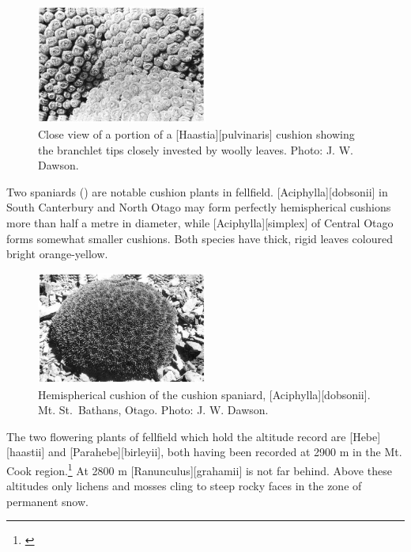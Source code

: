 \begin{figure}
	\includegraphics[width=0.5\textwidth]{graphics/figure109haastia.jpg}
	\centering
	\caption[Close view of a portion of a \emph{Haastia pulvinaris}]{Close view of a portion of a [Haastia][pulvinaris] cushion showing the branchlet tips closely invested by woolly leaves.
	Photo: J. W. Dawson.}%
	\label{fig:109haastia}
\end{figure}

Two spaniards () are notable cushion plants in fellfield. [Aciphylla][dobsonii] in South Canterbury and North Otago may form perfectly hemispherical cushions more than half a metre in diameter, while [Aciphylla][simplex] of Central Otago forms somewhat smaller cushions.
Both species have thick, rigid leaves coloured bright orange-yellow.

\begin{figure}
	\includegraphics[width=0.5\textwidth]{graphics/figure110cushion-spaniard.jpg}
	\centering
	\caption[Hemispherical cushion of the cushion spaniard]{Hemispherical cushion of the cushion spaniard, [Aciphylla][dobsonii].
	Mt. St.\ Bathans, Otago.
	Photo: J. W. Dawson.}%
	\label{fig:110cushion-spaniard}
\end{figure}

The two flowering plants of fellfield which hold the altitude record are [Hebe][haastii] and [Parahebe][birleyii], both having been recorded at 2900 m in the Mt.
Cook region.\footnote{\cite{wilson1978wild}}
At 2800 m [Ranunculus][grahamii] is not far behind.
Above these altitudes only lichens and mosses cling to steep rocky faces in the zone of permanent snow.

